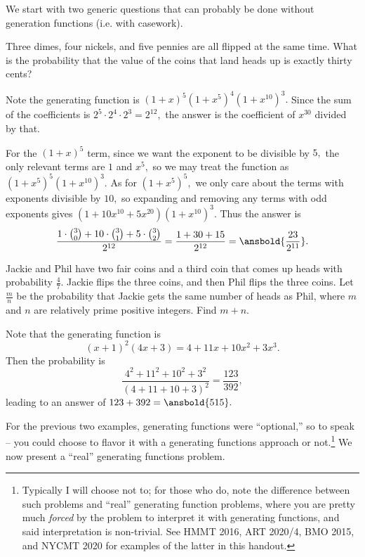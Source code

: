 \documentclass[mast]{lucky}
\begin{document}
We start with two generic questions that can probably be done without generation functions (i.e. with casework).

\begin{exam}
Three dimes, four nickels, and five pennies are all flipped at the same time. What is the probability that the value of the coins that land heads up is exactly thirty cents?
\end{exam}

\begin{sol}
Note the generating function is $(1+x)^5(1+x^5)^4(1+x^{10})^3.$ Since the sum of the coefficients is $2^5\cdot 2^4\cdot 2^3=2^{12},$ the answer is the coefficient of $x^{30}$ divided by that.

For the $(1+x)^5$ term, since we want the exponent to be divisible by $5,$ the only relevant terms are $1$ and $x^5,$ so we may treat the function as $(1+x^5)^5(1+x^{10})^3.$ As for $(1+x^5)^5,$ we only care about the terms with exponents divisible by $10,$ so expanding and removing any terms with odd exponents gives $(1+10x^{10}+5x^{20})(1+x^{10})^3.$ Thus the answer is
\[\frac{1\cdot\binom{3}{0}+10\cdot \binom{3}{1}+5\cdot\binom{3}{2}}{2^{12}}=\frac{1+30+15}{2^{12}}=\ansbold{\frac{23}{2^{11}}}.\]
\end{sol}

\begin{exam}[AIME I 2010/4]
Jackie and Phil have two fair coins and a third coin that comes up heads with probability $\frac47$. Jackie flips the three coins, and then Phil flips the three coins. Let $\frac {m}{n}$ be the probability that Jackie gets the same number of heads as Phil, where $m$ and $n$ are relatively prime positive integers. Find $m + n$. 
\end{exam}

\begin{sol}
Note that the generating function is
\[(x+1)^2(4x+3)=4+11x+10x^2+3x^3.\]
Then the probability is
\[\frac{4^2+11^2+10^2+3^2}{(4+11+10+3)^2}=\frac{123}{392},\]
leading to an answer of $123+392=\ansbold{515}.$
\end{sol}

For the previous two examples, generating functions were ``optional,'' so to speak -- you could choose to flavor it with a generating functions approach or not.\footnote{Typically I will choose not to; for those who do, note the difference between such problems and ``real'' generating function problems, where you are pretty much \textit{forced} by the problem to interpret it with generating functions, and said interpretation is non-trivial. See HMMT 2016, ART 2020/4, BMO 2015, and NYCMT 2020 for examples of the latter in this handout.} We now present a ``real'' generating functions problem.
\end{document}
